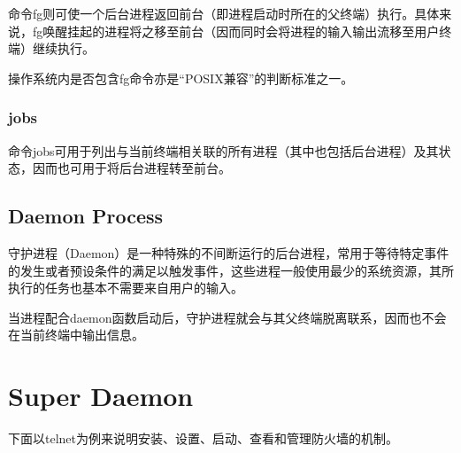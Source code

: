 命令fg则可使一个后台进程返回前台（即进程启动时所在的父终端）执行。具体来说，fg唤醒挂起的进程将之移至前台（因而同时会将进程的输入输出流移至用户终端）继续执行。

操作系统内是否包含fg命令亦是“POSIX兼容”的判断标准之一。


\subsection{jobs}


命令jobs可用于列出与当前终端相关联的所有进程（其中也包括后台进程）及其状态，因而也可用于将后台进程转至前台。






\section{Daemon Process}


守护进程（Daemon）是一种特殊的不间断运行的后台进程，常用于等待特定事件的发生或者预设条件的满足以触发事件，这些进程一般使用最少的系统资源，其所执行的任务也基本不需要来自用户的输入。

当进程配合daemon函数启动后，守护进程就会与其父终端脱离联系，因而也不会在当前终端中输出信息。






\chapter{Super Daemon}





下面以telnet为例来说明安装、设置、启动、查看和管理防火墙的机制。

